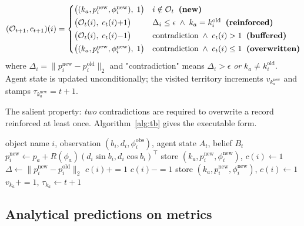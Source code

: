 \begin{equation}\label{eq:fourstate}
(\mathcal{O}_{t+1}, c_{t+1})(i) =
\begin{cases}
\big((k_a, p_i^{\mathrm{new}}, \phi_i^{\mathrm{new}}),\; 1\big) & i \notin \mathcal{O}_t \;\;\text{\textbf{(new)}}\\[2pt]
\big(\mathcal{O}_t(i),\; c_t(i){+}1\big) & \Delta_i \le \epsilon\;\wedge\; k_a = k_i^{\mathrm{old}}\;\;\text{\textbf{(reinforced)}}\\[2pt]
\big(\mathcal{O}_t(i),\; c_t(i){-}1\big) & \text{contradiction}\;\wedge\; c_t(i) > 1\;\;\text{\textbf{(buffered)}}\\[2pt]
\big((k_a, p_i^{\mathrm{new}}, \phi_i^{\mathrm{new}}),\; 1\big) & \text{contradiction}\;\wedge\; c_t(i) \le 1\;\;\text{\textbf{(overwritten)}}
\end{cases}
\end{equation}
where $\Delta_i = \|p_i^{\mathrm{new}} - p_i^{\mathrm{old}}\|_2$ and
"contradiction" means $\Delta_i > \epsilon$ \emph{or}
$k_a \ne k_i^{\mathrm{old}}$. Agent state is updated unconditionally;
the visited territory increments $v_{k_a^{\mathrm{new}}}$ and stamps
$\tau_{k_a^{\mathrm{new}}} = t{+}1$.

The salient property: \emph{two} contradictions are required to
overwrite a record reinforced at least once. Algorithm~\ref{alg:tb}
gives the executable form.

\begin{algorithm}[t]
\caption{\tb update for one observation}\label{alg:tb}
\begin{algorithmic}[1]
\Require object name $i$, observation $(b_i,d_i,\phi_i^{\mathrm{obs}})$, agent state $A_t$, belief $B_t$
\State $p_i^{\mathrm{new}}\gets p_a + R(\phi_a)(d_i\sin b_i, d_i\cos b_i)^\top$
 \State store $(k_a,p_i^{\mathrm{new}},\phi_i^{\mathrm{new}})$, $c(i){\gets}1$ 
\Else
  \State $\Delta\gets\|p_i^{\mathrm{new}}-p_i^{\mathrm{old}}\|_2$
   $c(i){+\!\!=\!}1$ 
   $c(i){-\!\!=\!}1$ 
  \Else \State store $(k_a,p_i^{\mathrm{new}},\phi_i^{\mathrm{new}})$, $c(i){\gets}1$ 
  \EndIf
\EndIf
\State $v_{k_a}{+\!\!=\!}1$, $\tau_{k_a}{\gets}t{+}1$
\end{algorithmic}
\end{algorithm}

\subsection{Analytical predictions on \tos metrics}

